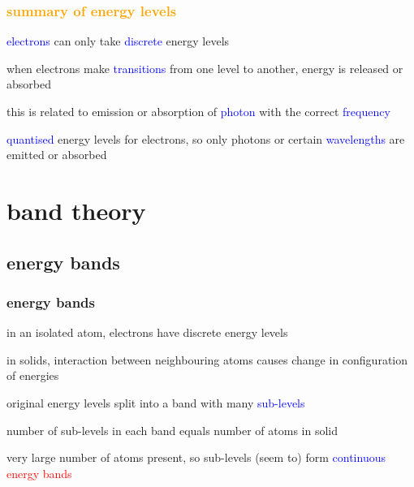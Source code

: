 \documentclass[12pt,xcolor=svgnames,handout]{beamer}
\newcommand{\tightframetitle}[1]{ %
\frametitle{#1}\vspace{-.6\baselineskip}}
\begin{document}
\begin{frame}
	\tightframetitle{\textcolor{orange}{summary of energy levels}}
	
	\begin{block}{}
		\textcolor{blue}{electrons} can only take \textcolor{blue}{discrete} energy levels
		
		when electrons make \textcolor{blue}{transitions} from one level to another, energy is released or absorbed
		
		this is related to emission or absorption of \textcolor{blue}{photon} with the correct \textcolor{blue}{frequency}
	\end{block}
	
	\begin{block}{}		
		\textcolor{blue}{quantised} energy levels for electrons, so only photons or certain \textcolor{blue}{wavelengths} are emitted or absorbed		
	\end{block}
	
\end{frame}

\section{band theory}
\subsection{energy bands}

\begin{frame}
	\tightframetitle{energy bands}
	
	\begin{block}{}
		in an isolated atom, electrons have discrete energy levels 
	
	\end{block}
	
	\begin{block}{}
		in solids, interaction between neighbouring atoms causes change in configuration of energies

		original energy levels split into a band with many \textcolor{blue}{sub-levels}
	\end{block}
	
	\begin{block}{}
		number of sub-levels in each band equals number of atoms in solid
		
		very large number of atoms present, so sub-levels (seem to) form \textcolor{blue}{continuous} \textcolor{red}{energy bands}
	\end{block}
	
\end{frame}
\end{document}
